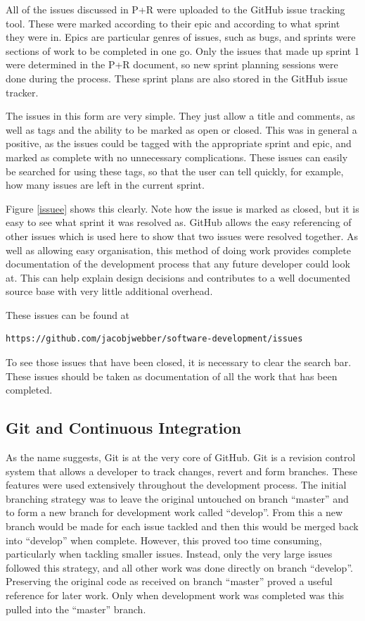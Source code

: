 \documentclass[a4paper,12pt]{article}
\begin{document}
All of the issues discussed in P+R were uploaded to the GitHub issue tracking tool. These were marked according to their epic and according to what sprint they were in. Epics are particular genres of issues, such as bugs, and sprints were sections of work to be completed in one go. Only the issues that made up sprint 1 were determined in the P+R document, so new sprint planning sessions were done during the process. These sprint plans are also stored in the GitHub issue tracker. 

The issues in this form are very simple. They just allow a title and comments, as well as tags and the ability to be marked as open or closed. This was in general a positive, as the issues could be tagged with the appropriate sprint and epic, and marked as complete with no unnecessary complications. These issues can easily be searched for using these tags, so that the user can tell quickly, for example, how many issues are left in the current sprint. 

Figure \ref{issuee} shows this clearly. Note how the issue is marked as closed, but it is easy to see what sprint it was resolved as. GitHub allows the easy referencing of other issues which is used here to show that two issues were resolved together. As well as allowing easy organisation, this method of doing work provides complete documentation of the development process that any future developer could look at. This can help explain design decisions and contributes to a well documented source base with very little additional overhead.

These issues can be found at
\begin{verbatim}
https://github.com/jacobjwebber/software-development/issues
\end{verbatim}

To see those issues that have been closed, it is necessary to clear the search bar. These issues should be taken as documentation of all the work that has been completed.

\subsection{Git and Continuous Integration}
As the name suggests, Git is at the very core of GitHub. Git is a revision control system that allows a developer to track changes, revert and form branches. These features were used extensively throughout the development process. The initial branching strategy was to leave the original untouched on branch ``master'' and to form a new branch for development work called ``develop''. From this a new branch would be made for each issue tackled and then this would be merged back into ``develop'' when complete. However, this proved too time consuming, particularly when tackling smaller issues. Instead, only the very large issues followed this strategy, and all other work was done directly on branch ``develop''. Preserving the original code as received on branch ``master'' proved a useful reference for later work. Only when development work was completed was this pulled into the ``master'' branch.
\end{document}
